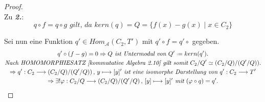\documentclass[10pt,a4paper]{report}
\newcommand{\functionfront}[3]{\nolinebreak{#1:#2 \longrightarrow #3}}
\newcommand{\function}[5]{\nolinebreak{#1:#2 \longrightarrow #3 \, , \, #4 \longmapsto #5}}
\newcommand*{\defeq}{\mathrel{\vcenter{\baselineskip0.5ex \lineskiplimit0pt
                     \hbox{\scriptsize.}\hbox{\scriptsize.}}}%
                     =}
\newcommand{\kernel}[1]{kern(#1)}
\begin{document}
\begin{proof}
\ \\
Zu \textit{\textbf{2.}}:\
$$q \circ f = q \circ g \textit{ gilt, da } \kernel{q} = Q = \lbrace f(x) - g(x)\mid x \in C_2 \rbrace$$

Sei nun eine Funktion $q' \in Hom_{\mathcal{A}}(C_2,T')$ mit $q' \circ f = q' \circ$ gegeben.
\begin{gather*}
q' \circ (f - g) = 0 \Rightarrow Q\textit{ ist Untermodul von }Q' \defeq \kernel{q'}.\\
\textit{Nach HOMOMORPHIESATZ [kommutative Algebra 2.10] gilt somit } \nolinebreak{C_2/Q' \simeq (C_2/Q)/(Q'/Q))}.\\
\Rightarrow \function{q'}{C_2}{(C_2/Q)/(Q'/Q))}{y}{[y]'} \textit{ ist eine isomorphe Darstellung von } \functionfront{q'}{C_2}{T'}\\
\Rightarrow \exists ! \function{\varphi}{C_2/Q}{(C_2/Q)/(Q'/Q)}{[y]}{[y]'}\textit{ mit }(\varphi \circ q) = q'.
\end{gather*}
\end{proof}
\end{document}
